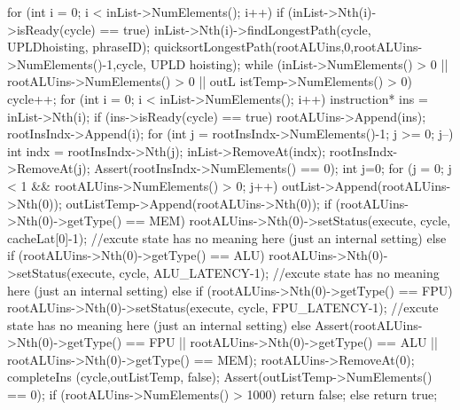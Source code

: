 \begin{DoxyCode}
                                                                                 
                                                                 {
        for (int i = 0; i < inList->NumElements(); i++) {
                if (inList->Nth(i)->isReady(cycle) == true) {
                        inList->Nth(i)->findLongestPath(cycle, UPLDhoisting, 
      phraseID);
                }
        }
        quicksortLongestPath(rootALUins,0,rootALUins->NumElements()-1,cycle, UPLD
      hoisting);
        while (inList->NumElements() > 0 || rootALUins->NumElements() > 0 || outL
      istTemp->NumElements() > 0) {
                cycle++;
                for (int i = 0; i < inList->NumElements(); i++) {
                        instruction* ins = inList->Nth(i);
                        if (ins->isReady(cycle) == true) {
                                rootALUins->Append(ins);
                                rootInsIndx->Append(i);
                        }
                }
                for (int j = rootInsIndx->NumElements()-1; j >= 0; j--) {
                        int indx = rootInsIndx->Nth(j);
                        inList->RemoveAt(indx);
                        rootInsIndx->RemoveAt(j);
                }
                Assert(rootInsIndx->NumElements() == 0);
                int j=0;
                for (j = 0; j < 1 && rootALUins->NumElements() > 0; j++) {
                        outList->Append(rootALUins->Nth(0));
                        outListTemp->Append(rootALUins->Nth(0));
                        if (rootALUins->Nth(0)->getType() == MEM) {
                                rootALUins->Nth(0)->setStatus(execute, cycle, 
      cacheLat[0]-1); //excute state has no meaning here (just an internal setting)
                        } else if (rootALUins->Nth(0)->getType() == ALU) {
                                rootALUins->Nth(0)->setStatus(execute, cycle, 
      ALU_LATENCY-1); //excute state has no meaning here (just an internal setting)
                        } else if (rootALUins->Nth(0)->getType() == FPU) {
                                rootALUins->Nth(0)->setStatus(execute, cycle, 
      FPU_LATENCY-1); //excute state has no meaning here (just an internal setting)
                        } else {
                                Assert(rootALUins->Nth(0)->getType() == FPU || 
                                       rootALUins->Nth(0)->getType() == ALU || 
                                       rootALUins->Nth(0)->getType() == MEM);
                        }
                        rootALUins->RemoveAt(0);
                }
                completeIns (cycle,outListTemp, false);
                Assert(outListTemp->NumElements() == 0);
        }
        if (rootALUins->NumElements() > 1000)
                return false;
        else
                return true;
}
\end{DoxyCode}


